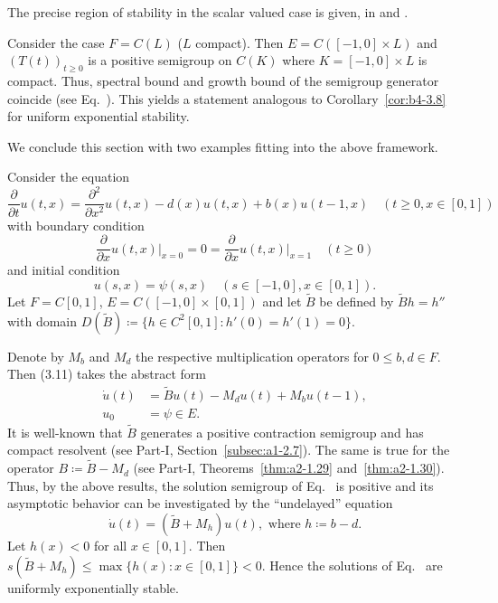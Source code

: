 The precise region of stability in the scalar valued case is given, \eg in \textcite{hadeler:1978}  and  \textcite[p.107ff]{hale:1977}.

\begin{remark*}
	Consider the case $F = C(L)$ ($L$ compact).
	Then $E = C([-1,0] \times L)$ and $(T(t))_{t\geq0}$ is a positive semigroup on $C(K)$ where $K = [-1,0] \times L$ is compact. 
	Thus, spectral bound and growth bound of the semigroup generator coincide (see Eq.~). 
	This yields a statement analogous to Corollary~\ref{cor:b4-3.8} for uniform exponential stability.
\end{remark*}
We conclude this section with two examples fitting into the above framework.
\begin{example}\label{ex:b4-3.11}
	Consider the equation
\[
    \frac{\partial}{\partial t}u(t,x) = 
    \frac{\partial^2}{\partial x^2}u(t,x) - d(x)u(t,x) + b(x)u(t-1,x) \quad (t\geq0,x\in[0,1])
\]
with boundary condition
\begin{equation}\label{eq:b4-3.11}
    \frac{\partial}{\partial x}u(t,x)\big|_{x=0} = 0 = \frac{\partial}{\partial x}u(t,x)\big|_{x=1} \quad (t\geq0)
\end{equation}
and initial condition
\[
	u(s,x) = \psi(s,x) \quad (s\in[-1,0],x\in[0,1]) .
\]
Let $F = C[0,1]$, $E = C([-1,0]\times[0,1])$ and let $\tilde{B}$ be defined by $\tilde{B}h = h''$ with domain $D(\tilde{B}) \coloneq  \{h \in C^2[0,1] \colon h'(0) = h'(1) = 0\}$.

Denote by $M_b$ and $M_d$ the respective multiplication operators for $0 \leq b,d \in F$. 
Then (3.11) takes the abstract form
\begin{align*}
	\dot{u}(t) &= \tilde{B}u(t) - M_du(t) + M_bu(t-1) ,\\
	u_0 &= \psi \in E .
\end{align*}
It is well-known that $\tilde{B}$ generates a positive contraction semigroup and has compact resolvent (see Part-I, Section~\ref{subsec:a1-2.7}). 
The same is true for the operator $B  \coloneq  \tilde{B} - M_d$ (see Part-I, Theorems~\ref{thm:a2-1.29} and~\ref{thm:a2-1.30}). 
Thus, by the above results, the solution semigroup of Eq.~ is positive and its asymptotic behavior can be investigated by the \enquote{undelayed} equation
\[
\dot{u}(t) = (\tilde{B} + M_h)u(t) , \text{ where } h \coloneq  b - d .
\]
Let $h(x) < 0$ for all $x \in [0,1]$.
Then $s(\tilde{B} + M_h) \leq \max\{h(x) \colon x \in [0,1]\} < 0$. 
Hence the solutions of Eq.~ are uniformly exponentially stable.
\end{example}
